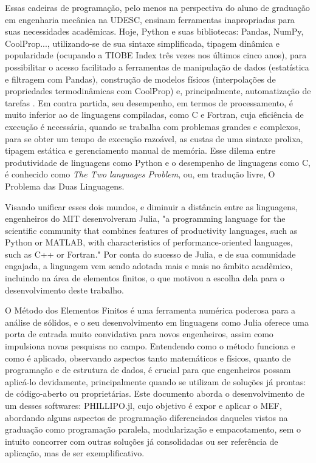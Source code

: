 Essas cadeiras de programação, pelo menos na perspectiva do aluno de graduação em engenharia mecânica na UDESC, ensinam ferramentas inapropriadas para suas necessidades acadêmicas. Hoje, Python e suas bibliotecas: Pandas, NumPy, CoolProp..., utilizando-se de sua sintaxe simplificada, tipagem dinâmica e popularidade (ocupando a TIOBE Index três vezes nos últimos cinco anos), para possibilitar o acesso facilitado a ferramentas de manipulação de dados (estatística e filtragem com Pandas), construção de modelos físicos (interpolações de propriedades termodinâmicas com CoolProp) e, principalmente, automatização de tarefas \cite{ernesti}. Em contra partida, seu desempenho, em termos de processamento, é muito inferior ao de linguagens compiladas, como C e Fortran, cuja eficiência de execução é necessária, quando se trabalha com problemas grandes e complexos, para se obter um tempo de execução razoável, as custas de uma sintaxe prolixa, tipagem estática e gerenciamento manual de memória. Esse dilema entre produtividade de linguagens como Python e o desempenho de linguagens como C, é conhecido como \emph{The Two languages Problem}, ou, em tradução livre, O Problema das Duas Linguagens.

Visando unificar esses dois mundos, e diminuir a distância entre as linguagens, engenheiros do MIT desenvolveram Julia, "a programming language for the scientific community that combines features of productivity languages, such as Python or MATLAB, with characteristics of performance-oriented languages, such as C++ or Fortran." \cite[tradução livre]{Bezanson} Por conta do sucesso de Julia, e de sua comunidade engajada, a linguagem vem sendo adotada mais e mais no âmbito acadêmico, incluindo na área de elementos finitos, o que motivou a escolha dela para o desenvolvimento deste trabalho.

O Método dos Elementos Finitos é uma ferramenta numérica poderosa para a análise de sólidos, e o seu desenvolvimento em linguagens como Julia oferece uma porta de entrada muito convidativa para novos engenheiros, assim como impulsiona novas pesquisas no campo. Entendendo como o método funciona e como é aplicado, observando aspectos tanto matemáticos e físicos, quanto de programação e de estrutura de dados, é crucial para que engenheiros possam aplicá-lo devidamente, principalmente quando se utilizam de soluções já prontas: de código-aberto ou proprietárias. Este documento aborda o desenvolvimento de um desses softwares: PHILLIPO.jl, cujo objetivo é expor e aplicar o MEF, abordando alguns aspectos de programação diferenciados daqueles vistos na graduação como programação paralela, modularização e empacotamento, sem o intuito concorrer com outras soluções já consolidadas ou ser referência de aplicação, mas de ser exemplificativo.

